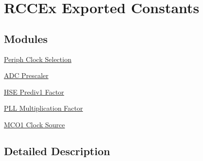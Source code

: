 \hypertarget{group___r_c_c_ex___exported___constants}{}\section{R\+C\+C\+Ex Exported Constants}
\label{group___r_c_c_ex___exported___constants}
\subsection*{Modules}
\begin{DoxyCompactItemize}
\item 
\hyperlink{group___r_c_c_ex___periph___clock___selection}{Periph Clock Selection}
\item 
\hyperlink{group___r_c_c_ex___a_d_c___prescaler}{A\+D\+C Prescaler}
\item 
\hyperlink{group___r_c_c_ex___prediv1___factor}{H\+S\+E Prediv1 Factor}
\item 
\hyperlink{group___r_c_c_ex___p_l_l___multiplication___factor}{P\+L\+L Multiplication Factor}
\item 
\hyperlink{group___r_c_c_ex___m_c_o1___clock___source}{M\+C\+O1 Clock Source}
\end{DoxyCompactItemize}


\subsection{Detailed Description}

